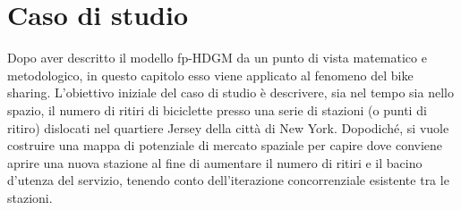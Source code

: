 \chapter[Caso di studio]{Caso di studio}

Dopo aver descritto il modello fp-HDGM da un punto di vista matematico e metodologico, in questo capitolo esso viene applicato al fenomeno del bike sharing. L'obiettivo iniziale del caso di studio è descrivere, sia nel tempo sia nello spazio, il numero di ritiri di biciclette presso una serie di stazioni (o punti di ritiro) dislocati nel quartiere Jersey della città di New York. Dopodiché, si vuole costruire una mappa di potenziale di mercato spaziale per capire dove conviene aprire una nuova stazione al fine di aumentare il numero di ritiri e il bacino d'utenza del servizio, tenendo conto dell'iterazione concorrenziale esistente tra le stazioni.

